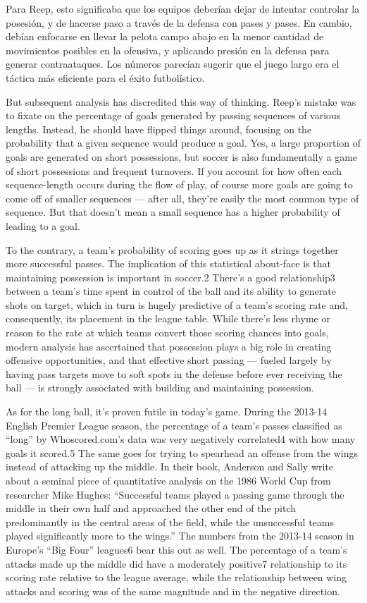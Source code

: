 Para Reep, esto significaba que los equipos deberían dejar de intentar controlar la posesión,
y de hacerse paso a través de la defensa con pases y pases. En cambio,
debían enfocarse en llevar la pelota campo abajo en la menor cantidad de movimientos posibles
en la ofensiva, y aplicando presión en la defensa para generar
contraataques. Los números parecían sugerir que el juego largo era el
táctica más eficiente para el éxito futbolístico.

But subsequent analysis has discredited this way of thinking. Reep’s mistake 
was to fixate on the percentage of goals generated by passing sequences of 
various lengths. Instead, he should have flipped things around, focusing on 
the probability that a given sequence would produce a goal. Yes, a large 
proportion of goals are generated on short possessions, but soccer is also 
fundamentally a game of short possessions and frequent turnovers. If you 
account for how often each sequence-length occurs during the flow of play, 
of course more goals are going to come off of smaller sequences — after all, 
they’re easily the most common type of sequence. But that doesn’t mean a 
small sequence has a higher probability of leading to a goal.

To the contrary, a team’s probability of scoring goes up as it strings together more successful passes. The implication of this statistical about-face is that maintaining possession is important in soccer.2 There’s a good relationship3 between a team’s time spent in control of the ball and its ability to generate shots on target, which in turn is hugely predictive of a team’s scoring rate and, consequently, its placement in the league table. While there’s less rhyme or reason to the rate at which teams convert those scoring chances into goals, modern analysis has ascertained that possession plays a big role in creating offensive opportunities, and that effective short passing — fueled largely by having pass targets move to soft spots in the defense before ever receiving the ball — is strongly associated with building and maintaining possession.

As for the long ball, it’s proven futile in today’s game. During the 2013-14 English Premier League season, the percentage of a team’s passes classified as “long” by Whoscored.com’s data was very negatively correlated4 with how many goals it scored.5
The same goes for trying to spearhead an offense from the wings instead of attacking up the middle. In their book, Anderson and Sally write about a seminal piece of quantitative analysis on the 1986 World Cup from researcher Mike Hughes: “Successful teams played a passing game through the middle in their own half and approached the other end of the pitch predominantly in the central areas of the field, while the unsuccessful teams played significantly more to the wings.” The numbers from the 2013-14 season in Europe’s “Big Four” leagues6 bear this out as well. The percentage of a team’s attacks made up the middle did have a moderately positive7 relationship to its scoring rate relative to the league average, while the relationship between wing attacks and scoring was of the same magnitude and in the negative direction.

